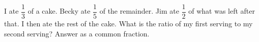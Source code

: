 I ate \(\dfrac{1}{3}\) of a cake. Becky ate \(\dfrac{1}{5}\) of the remainder. Jim ate \(\dfrac{1}{2}\) of what was left after that. I then ate the rest of the cake. What is the ratio of my first serving to my second serving? Answer as a common fraction.
